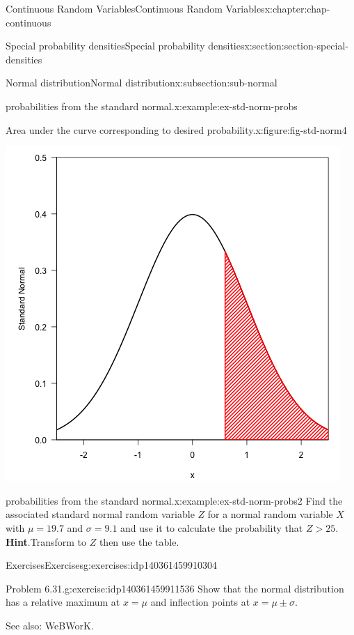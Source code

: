 \documentclass[oneside,10pt,]{book}
\newcommand{\blocktitlefont}{\relax}
\numberwithin{equation}{section}
\newcommand{\gt}{>}
\begin{document}
\begin{chapterptx}{Continuous Random Variables}{}{Continuous Random Variables}{}{}{x:chapter:chap-continuous}
\begin{sectionptx}{Special probability densities}{}{Special probability densities}{}{}{x:section:section-special-densities}
\begin{subsectionptx}{Normal distribution}{}{Normal distribution}{}{}{x:subsection:sub-normal}
\begin{example}{probabilities from the standard normal.}{x:example:ex-std-norm-probs}
\begin{figureptx}{Area under the curve corresponding to desired probability.}{x:figure:fig-std-norm4}{}
\begin{image}{0.25}{0.5}{0.25}
\includegraphics[width=\linewidth]{./images/std_norm4.png}
\end{image}%
\tcblower
\end{figureptx}%
\end{example}
\begin{example}{probabilities from the standard normal.}{x:example:ex-std-norm-probs2}%
Find the associated standard normal random variable \(Z\) for a normal random variable \(X\) with \(\mu = 19.7\) and \(\sigma = 9.1\) and use it to calculate the probability that \(Z \gt 25\).%
\textbf{\blocktitlefont Hint}.\quad{}Transform to \(Z\) then use the table.%
\end{example}
%
%
\typeout{************************************************}
\typeout{************************************************}
%
\begin{exercises-subsubsection}{Exercises}{}{Exercises}{}{}{g:exercises:idp140361459910304}
\begin{divisionexercise}{1}{Problem 6.31.}{}{g:exercise:idp140361459911536}%
Show that the normal distribution has a relative maximum at \(x =
\mu\) and inflection points at \(x = \mu \pm \sigma\).%
\end{divisionexercise}%
See also: WeBWorK.%
\end{exercises-subsubsection}
\end{subsectionptx}

\end{sectionptx}
\end{chapterptx}
\end{document}
